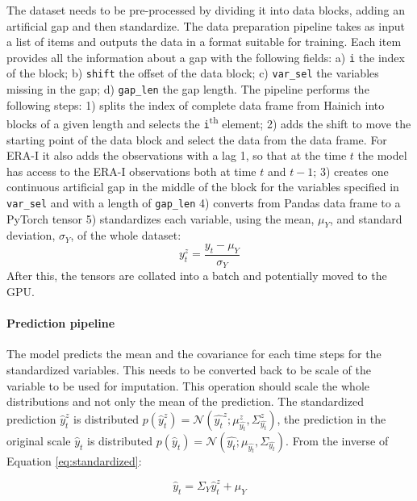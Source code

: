 \documentclass{article}
\newcommand{\norm}[3]{\mathcal{N}\left(#1; #2, #3\right)} %
\begin{document}
The dataset needs to be pre-processed by dividing it into data blocks, adding an artificial gap and then standardize. The data preparation pipeline takes as input a list of items and outputs the data in a format suitable for training. Each item provides all the information about a gap with the following fields: a) \verb|i| the index of the block; b) \verb|shift|  the offset of the data block; c) \verb|var_sel| the variables missing in the gap; d) \verb|gap_len| the gap length. The pipeline performs the following steps: 1) splits the index of complete data frame from Hainich into blocks of a given length and selects the \texttt{i}\textsuperscript{th} element;  2) adds the shift to move the starting point of the data block and select the data from the data frame. For ERA-I it also adds the observations with a lag 1, so that at the time $t$ the model has access to the ERA-I observations both at time $t$ and $t-1$; 3) creates one continuous artificial gap in the middle of the block for the variables specified in \verb|var_sel| and with a length of \verb|gap_len| 4) converts from \textsf{Pandas} data frame to a \textsf{PyTorch} tensor 5) standardizes each variable, using the mean, $\mu_Y$, and standard deviation, $\sigma_Y$, of the whole dataset:
\begin{equation}\label{eq:standardized}
    y^z_t = \frac{y_t - \mu_Y}{\sigma_Y}
\end{equation}
After this, the tensors are collated into a batch and potentially moved to the GPU.

\paragraph{Prediction pipeline} The model predicts the mean and the covariance for each time steps for the standardized variables. This needs to be converted back to be scale of the variable to be used for imputation. This operation should scale the whole distributions and not only the mean of the prediction. The standardized prediction $\hat{y}^z_t$ is distributed $p(\hat{y}^z_t) = \norm{\hat{y_t}^z}{\mu^z_{\hat{y_t}}}{\Sigma^z_{\hat{y_t}}}$, the prediction in the original scale $\hat{y}_t$ is distributed $p(\hat{y}_t) =  \norm{\hat{y_t}}{\mu_{\hat{y_t}}}{\Sigma_{\hat{y_t}}}$. From the inverse of Equation \ref{eq:standardized}:

\begin{equation*}
    \hat{y}_t = \Sigma_Y\hat{y}^z_t + \mu_Y
\end{equation*}
\end{document}
